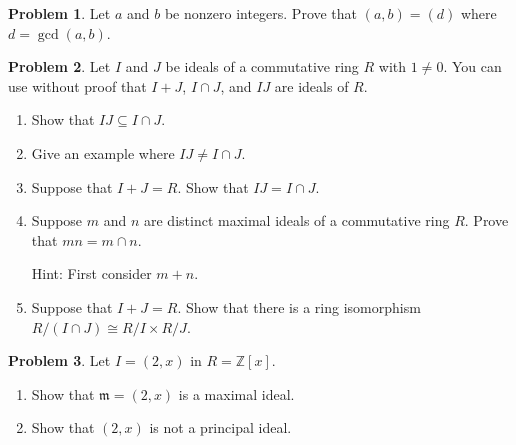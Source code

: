 \documentclass[11pt]{article}
\newcommand{\ZZ}{\mathbb{Z}}
\theoremstyle{definition}
\newtheorem{problem}{Problem}
\begin{document}
  


\begin{problem}
Let $a$ and $b$ be nonzero integers. Prove that $(a,b)=(d)$ where $d=\gcd(a,b)$.
\end{problem}



\begin{problem}
Let $I$ and $J$ be ideals of a commutative ring $R$ with $1 \neq 0$. 
You can use without proof that $I+J$, $I \cap J$, and $IJ$ are ideals of $R$.

\begin{enumerate}[label=(3.\arabic*), itemsep=-0.1em]
\vspace{-0.1em}
\item Show that $IJ \subseteq I \cap J$.

\item Give an example where $IJ \neq I \cap J$.

\item Suppose that $I + J = R$. Show that $IJ = I \cap J$.


\item Suppose $m$ and $n$ are distinct maximal ideals of a commutative ring $R$.  Prove that $mn=m\cap n$. 

\noindent
Hint: First consider $m + n$.


\item Suppose that $I + J = R$. Show that there is a ring isomorphism $R/(I\cap J) \cong  R/I\times R/J$. 

\end{enumerate}
\end{problem}




\begin{problem}
	Let $I = (2,x)$ in $R = \ZZ[x]$.
	
\begin{enumerate}[label=(4.\arabic*), itemsep=-0.1em]
\vspace{-0.5em}

\item Show that $\mathfrak{m} = (2, x)$ is a maximal ideal.
	
\item Show that $(2,x)$ is not a principal ideal.
\end{enumerate}
\end{problem}
\end{document}
